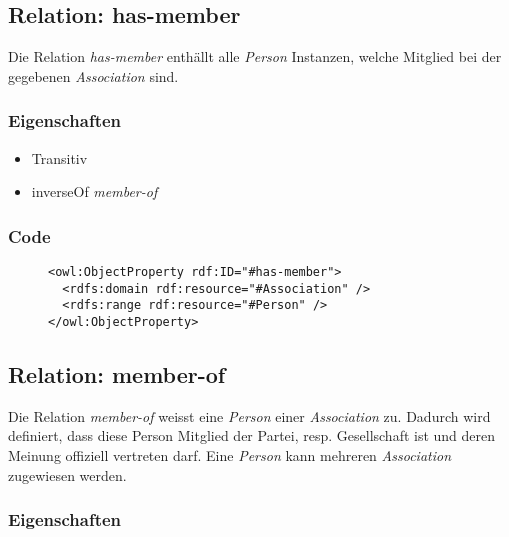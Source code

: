 \documentclass[
    11pt,
    latin1,
    a4paper,
    oneside
]{scrreprt}
\begin{document}
\subsection{Relation: has-member} \label{sec:rel_hasmember}

Die Relation \emph{has-member} enth\"allt alle \emph{Person} Instanzen, welche Mitglied bei der gegebenen \emph{Association} sind.

\subsubsection{Eigenschaften} \label{sec:rel_hasmember_settings}

\begin{itemize}
  \item Transitiv
  \item inverseOf \emph{member-of}
\end{itemize}

\subsubsection{Code} \label{sec:rel_hasmember_code}

\begin{figure}[h]
 \lstset{language=XML}
 \begin{lstlisting}[label=owl:ahsmember,caption={Die Relation \emph{has-member} enth\"allt alle Mitglieder der \emph{Association}}]
<owl:ObjectProperty rdf:ID="#has-member">
  <rdfs:domain rdf:resource="#Association" />
  <rdfs:range rdf:resource="#Person" />
</owl:ObjectProperty>
 \end{lstlisting}
\end{figure}


\subsection{Relation: member-of} \label{sec:rel_memberof}

Die Relation \emph{member-of} weisst eine \emph{Person} einer \emph{Association} zu. Dadurch wird definiert, dass diese Person Mitglied der Partei, resp. Gesellschaft ist und deren Meinung offiziell vertreten darf. Eine \emph{Person} kann mehreren \emph{Association} zugewiesen werden.

\subsubsection{Eigenschaften} \label{sec:rel_memberof_settings}
\end{document}
